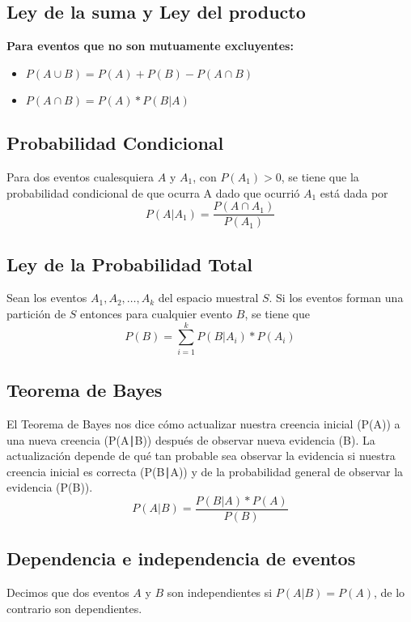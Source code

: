 \documentclass{report}
\begin{document}
\subsection{Ley de la suma y Ley del producto}

\textbf{Para eventos que no son mutuamente excluyentes:}
\\
\begin{itemize}
    \item\(P(A \cup B) = P(A) + P(B) - P(A \cap B)\)
    \item \(P(A \cap B) = P(A)*P(B|A)\)
\end{itemize}

\subsection{Probabilidad Condicional}
Para dos eventos cualesquiera \(A\) y \(A_1\), con \(P(A_1) > 0\), se tiene que la  probabilidad condicional de que ocurra A dado que ocurrió \(A_1\) está dada por \\

\[P(A|A_1) =  \frac{P(A \cap A_1)}{P(A_1)}\]

\subsection{Ley de la Probabilidad Total}
Sean los eventos \(A_1, A_2, \dots, A_k\) del espacio muestral \(S\). Si los eventos forman una partición de \(S\) entonces para cualquier evento \(B\), se tiene que \\
\[P(B) = \sum_{i=1}^{k} P(B|A_i)*P(A_i) \]


\subsection{Teorema de Bayes}
El Teorema de Bayes nos dice cómo actualizar nuestra creencia inicial (P(A)) a una nueva creencia (P(A∣B)) después de observar nueva evidencia (B). La actualización depende de qué tan probable sea observar la evidencia si nuestra creencia inicial es correcta (P(B∣A)) y de la probabilidad general de observar la evidencia (P(B)).
\[P(A|B) = \frac {P(B|A)*P(A)}{P(B)}\]
\subsection{Dependencia e independencia de eventos}
Decimos que dos eventos \(A\) y \(B\) son independientes si \(P(A|B)= P(A)\), de lo contrario son dependientes. 
\end{document}
